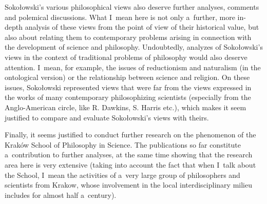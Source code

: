 \documentclass[%
  manuscript=article,
  year=2024,
  volume=77,
  doi=00000.000,
]{zfn}
\begin{document}
Sokołowski's various philosophical views also deserve further analyses, comments and polemical discussions. What I~mean here is not only a~further, more in-depth analysis of these views from the point of view of their historical value, but also about relating them to contemporary problems arising in connection with the development of science and philosophy. Undoubtedly, analyzes of Sokołowski's views in the context of traditional problems of philosophy would also deserve attention. I~mean, for example, the issues of reductionism and naturalism (in the ontological version) or the relationship between science and religion. On these issues, Sokołowski represented views that were far from the views expressed in the works of many contemporary philosophizing scientists (especially from the Anglo-American circle, like R. Dawkins, S. Harris etc.), which makes it seem justified to compare and evaluate Sokołowski's views with theirs.



Finally, it seems justified to conduct further research on the phenomenon of the Kraków School of Philosophy in Science. The publications so far constitute a~contribution to further analyses, at the same time showing that the research area here is very extensive (taking into account the fact that when I~talk about the School, I~mean the activities of a~very large group of philosophers and scientists from Krakow, whose involvement in the local interdisciplinary milieu includes for almost half a~century).





\printbibliography
\end{document}
